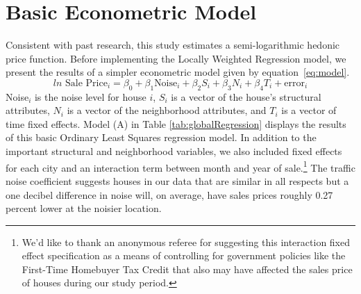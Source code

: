 \documentclass{article}\usepackage[]{graphicx}\usepackage[]{color}
\begin{document}
\section{Basic Econometric Model}\label{basicModel}
Consistent with past research, this study estimates a semi-logarithmic hedonic price function.  Before implementing the Locally Weighted Regression model, we present the results of a simpler econometric model given by equation~\eqref{eq:model}.
\begin{equation}\label{eq:model}	
ln \textrm{ Sale Price}_i = \beta _0 + \beta _1 \textrm{Noise}_i+ \beta _2 S_i+ \beta _3 N_i + \beta _4 T_i + \textrm{error}_i
\end{equation}
Noise$_i$ is the noise level for house $i$, $S_i$ is a vector of the house's structural attributes, $N_i$ is a vector of the neighborhood attributes, and $T_i$ is a vector of time fixed effects. Model (A) in Table \ref{tab:globalRegression} displays the results of this basic Ordinary Least Squares regression model. In addition to the important structural and neighborhood variables, we also included fixed effects for each city and an interaction term between month and year of sale.\footnote{We'd like to thank an anonymous referee for suggesting this interaction fixed effect specification as a means of controlling for government policies like the First-Time Homebuyer Tax Credit that also may have affected the sales price of houses during our study period. } The traffic noise coefficient suggests houses in our data that are similar in all respects but a one decibel difference in noise will, on average, have sales prices roughly 0.27 percent lower at the noisier location. 
\end{document}
